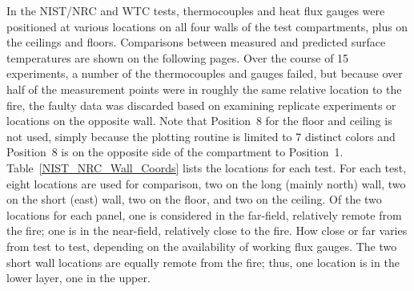 In the NIST/NRC and WTC tests, thermocouples and heat flux gauges were positioned at various locations on all four walls of the test compartments, plus on the ceilings and floors. Comparisons between measured and predicted surface temperatures are shown on the following pages. Over the course of 15 experiments, a number of the thermocouples and gauges failed, but because over half of the measurement points were in roughly the same relative location to the fire, the faulty data was discarded based on examining replicate experiments or locations on the opposite wall. Note that Position~8 for the floor and ceiling is not used, simply because the plotting routine is limited to 7 distinct colors and Position~8 is on the opposite side of the compartment to Position~1. Table~\ref{NIST_NRC_Wall_Coords} lists the locations for each test. For each test, eight locations are used for comparison, two on the long (mainly north) wall, two on the short (east) wall, two on the floor, and two on the ceiling.  Of the two locations for each panel, one is considered in the far-field, relatively remote from the fire; one is in the near-field, relatively close to the fire.  How close or far varies from test to test, depending on the availability of working flux gauges. The two short wall locations are equally remote from the fire; thus, one location is in the lower layer, one in the upper.

